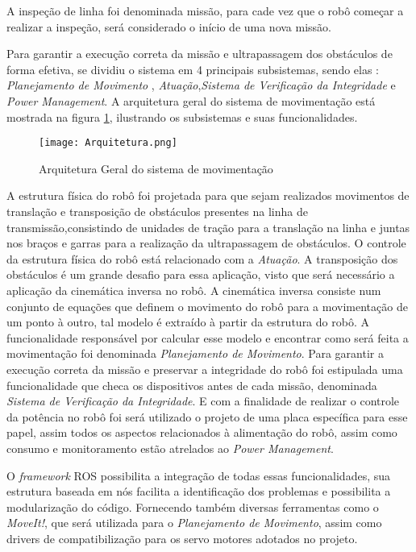 A inspeção de linha foi denominada missão, para cade vez que o robô começar a realizar a inspeção, será considerado o início de uma nova missão. 

Para garantir a execução correta da missão e ultrapassagem dos obstáculos de forma efetiva, se dividiu o sistema em 4 principais subsistemas, sendo elas : \textit{Planejamento de Movimento} , \textit{Atuação},\textit{Sistema de Verificação da Integridade} e \textit{Power Management}. A arquitetura geral do sistema de movimentação está mostrada na figura \ref{fig:arq_geral}, ilustrando os subsistemas e suas funcionalidades. 
\begin{figure}[h]
	\centering
	\texttt{[image: Arquitetura.png]}
	\caption{Arquitetura Geral do sistema de movimentação}
	\label{fig:arq_geral}
\end{figure} 
A estrutura física do robô foi projetada para que sejam realizados movimentos de translação e transposição de obstáculos presentes na linha de transmissão,consistindo de unidades de tração para a translação na linha e juntas nos braços e garras para a realização da ultrapassagem de obstáculos. O controle da estrutura física do robô está relacionado com a \textit{Atuação}.
A transposição dos obstáculos é um grande desafio para essa aplicação, visto que será necessário a aplicação da cinemática inversa no robô. A cinemática inversa consiste num conjunto de equações que definem o movimento do robô para a movimentação de um ponto à outro, tal modelo é extraído à partir da estrutura do robô. A funcionalidade responsável por calcular esse modelo e encontrar como será feita a movimentação foi denominada \textit{Planejamento de Movimento}.
Para garantir a execução correta da missão e preservar a integridade do robô foi estipulada uma funcionalidade que checa os dispositivos antes de cada missão, denominada \textit{Sistema de Verificação da Integridade}. E com a finalidade de realizar o controle da potência no robô foi será utilizado o projeto de uma placa específica para esse papel, assim todos os aspectos relacionados à alimentação do robô, assim como consumo e monitoramento estão atrelados ao \textit{Power Management}.

O \textit{framework} ROS possibilita a integração de todas essas funcionalidades, sua estrutura baseada em nós facilita a identificação dos problemas e possibilita a modularização do código. Fornecendo também diversas ferramentas como o \textit{MoveIt!}, que será utilizada para o \textit{Planejamento de Movimento}, assim como drivers de compatibilização para os servo motores adotados no projeto.


